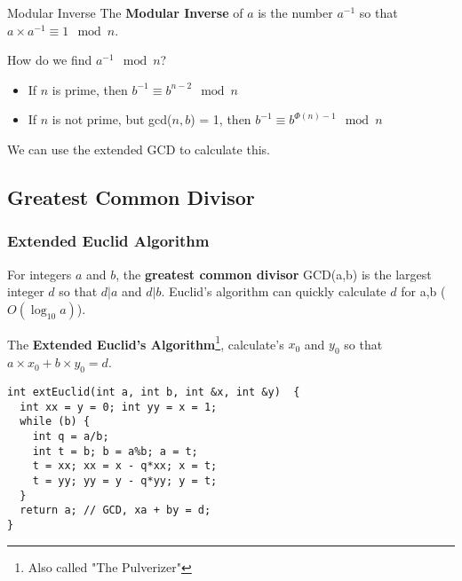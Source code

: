 \begin{frame}{Modular Inverse}
  The {\bf Modular Inverse} of $a$ is the number $a^{-1}$ so that $a\times a^{-1} \equiv 1 \mod n$. \medskip

  How do we find $a^{-1}\mod n$?
  \begin{itemize}
    \item If $n$ is prime, then $b^{-1} \equiv b^{n-2}\mod n$
    \item If $n$ is not prime, but gcd($n,b$) = 1, then $b^{-1} \equiv b^{\Phi(n)-1} \mod n$
  \end{itemize}\bigskip

  We can use the extended GCD to calculate this.

\end{frame}


\subsection{Greatest Common Divisor}
\begin{frame}[fragile]
  \frametitle{Extended Euclid Algorithm}

  For integers $a$ and $b$, the {\bf greatest common divisor} GCD(a,b) is the largest integer $d$ so that $d|a$ and $d|b$. Euclid's algorithm can quickly calculate $d$ for a,b ($O(\log_{10}a)$).\bigskip

  The {\bf Extended Euclid's Algorithm}\footnote{Also called "The Pulverizer"}, calculate's $x_0$ and $y_0$ so that $a\times x_0 + b\times y_0 = d$.

{\smaller
    \begin{exampleblock}{}
\begin{verbatim}
int extEuclid(int a, int b, int &x, int &y)  {
  int xx = y = 0; int yy = x = 1;
  while (b) {
    int q = a/b;
    int t = b; b = a%b; a = t;
    t = xx; xx = x - q*xx; x = t;
    t = yy; yy = y - q*yy; y = t;
  }
  return a; // GCD, xa + by = d;
}
\end{verbatim}
    \end{exampleblock}
}
\end{frame}


